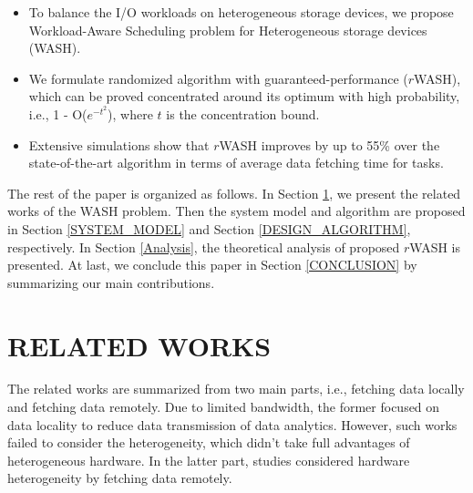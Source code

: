 \documentclass[conference]{IEEEtran}
\begin{document}
\begin{itemize}
\item To balance the I/O workloads on heterogeneous storage devices, we propose Workload-Aware Scheduling problem for Heterogeneous storage devices (WASH).
\item We formulate randomized algorithm with guaranteed-performance ($r$WASH), which can be proved concentrated around its optimum with high probability, i.e., 1 - O($e^{-t^2}$), where $t$ is the concentration bound.
\item Extensive simulations show that $r$WASH improves by up to 55\% over the state-of-the-art algorithm in terms of average data fetching time for tasks.
\end{itemize}

The rest of the paper is organized as follows. In Section \ref{RELATED_WORKS}, we present the related works of the WASH problem. 
Then the system model and algorithm are proposed in Section \ref{SYSTEM_MODEL} and Section \ref{DESIGN_ALGORITHM}, respectively. 
In Section \ref{Analysis}, the theoretical analysis of proposed $r$WASH is presented.
At last, we conclude this paper in Section \ref{CONCLUSION} by summarizing our main contributions.


\section{RELATED WORKS}\label{RELATED_WORKS}
The related works are summarized from two main parts, i.e., fetching data locally and fetching data remotely. Due to limited bandwidth, the former focused on data locality \cite{b2} \cite{b3} \cite{b4} \cite{b5} to reduce data transmission of data analytics. However, such works failed to consider the heterogeneity, which didn't take full advantages of heterogeneous hardware. In the latter part, studies \cite{b1} \cite{b6} \cite{b19} \cite{b8} considered hardware heterogeneity by fetching data remotely.
\end{document}
